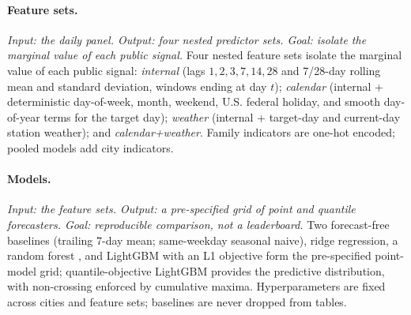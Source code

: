 \paragraph{Feature sets.}
\emph{Input: the daily panel. Output: four nested predictor sets. Goal:
isolate the marginal value of each public signal.}
Four nested feature sets isolate the marginal value of each public
signal: \emph{internal} (lags $1,2,3,7,14,28$ and 7/28-day rolling mean
and standard deviation, windows ending at day $t$); \emph{calendar}
(internal + deterministic day-of-week, month, weekend, U.S. federal
holiday, and smooth day-of-year terms for the target day);
\emph{weather} (internal + target-day and current-day station weather);
and \emph{calendar+weather}. Family indicators are one-hot encoded;
pooled models add city indicators.

\paragraph{Models.}
\emph{Input: the feature sets. Output: a pre-specified grid of point and
quantile forecasters. Goal: reproducible comparison, not a leaderboard.}
Two forecast-free baselines (trailing 7-day mean; same-weekday seasonal
naive), ridge regression, a random forest \citep{breiman2001random}, and
LightGBM with an L1 objective \citep{ke2017lightgbm} form the
pre-specified point-model grid; quantile-objective LightGBM
\citep[following][]{koenker1978regression} provides the predictive
distribution, with non-crossing enforced by cumulative maxima.
Hyperparameters are fixed across cities and feature sets; baselines are
never dropped from tables.

